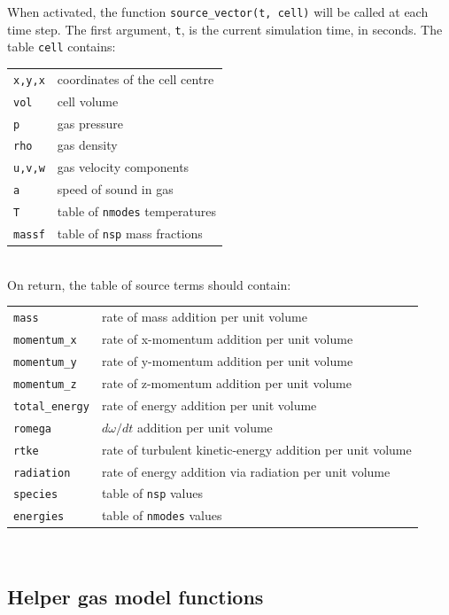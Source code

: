 \bigskip
When activated, the function \texttt{source\_vector(t, cell)} will be called at each time step.
The first argument, \texttt{t}, is the current simulation time, in seconds.
The table \texttt{cell} contains:\\
\begin{tabular}{ll}
 \texttt{x,y,x} & coordinates of the cell centre \\
 \texttt{vol} & cell volume \\
 \texttt{p} & gas pressure \\
 \texttt{rho} & gas density \\
 \texttt{u,v,w} & gas velocity components \\
 \texttt{a} & speed of sound in gas \\
 \texttt{T} & table of \texttt{nmodes} temperatures \\
 \texttt{massf} & table of \texttt{nsp} mass fractions \\
\end{tabular}\\
On return, the table of source terms should contain:\\
\begin{tabular}{ll}
 \texttt{mass} &  rate of mass addition per unit volume\\
 \texttt{momentum\_x} & rate of x-momentum addition per unit volume\\
 \texttt{momentum\_y} & rate of y-momentum addition per unit volume\\
 \texttt{momentum\_z} & rate of z-momentum addition per unit volume\\
 \texttt{total\_energy} & rate of energy addition per unit volume\\
 \texttt{romega} & $d\omega/dt$ addition per unit volume\\
 \texttt{rtke} & rate of turbulent kinetic-energy addition per unit volume\\
 \texttt{radiation} & rate of energy addition via radiation per unit volume\\
 \texttt{species} & table of \texttt{nsp} values\\
 \texttt{energies} & table of \texttt{nmodes} values\\
\end{tabular}\\

\subsection{Helper gas model functions}
\label{sec:udf-gas-service}

